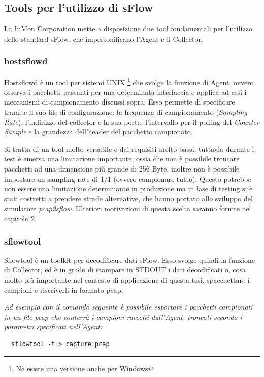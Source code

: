 \documentclass[12pt,a4paper,openright,twoside]{report}
\begin{document}
\subsection{Tools per l'utilizzo di sFlow}

La InMon Corporation mette a disposizione due tool fondamentali per l'utilizzo dello
standard sFlow, che impersonificano l'Agent e il Collector.

\subsubsection{hostsflowd}
Hostsflowd \`e un tool per sistemi UNIX \footnote{Ne esiste una versione anche per Windows}
che svolge la funzione di Agent, ovvero osserva
i pacchetti passanti per una determinata interfaccia e applica ad essi i meccanismi di
campionamento discussi sopra. Esso permette di specificare tramite il suo file di configurazione:
la frequenza di campionamento ({\it Sampling Rate}), l'indirizzo del collector e la
sua porta, l'intervallo per il polling del {\it Counter Sample} e la grandezza dell'header
del pacchetto campionato.

Si tratta di un tool molto versatile e dai requisiti molto bassi, tuttavia durante
i test \`e emersa una limitazione importante, ossia che non \`e possibile
troncare pacchetti ad una dimensione pi\`u grande di 256 Byte, inoltre non \`e possibile
impostare un sampling rate di 1/1 (ovvero campionare tutto). Questo potrebbe non essere
una limitazione determinante in produzione ma in fase di testing si \`e stati costretti
a prendere strade alternative, che hanno portato allo sviluppo del simulatore {\it pcap2sflow}.
Ulteriori motivazioni di questa scelta saranno fornite nel capitolo 2.

\subsubsection{sflowtool}

Sflowtool \`e un toolkit per decodificare
dati sFlow. Esso svolge quindi la funzione di Collector, ed \`e in grado di stampare
in STDOUT i dati decodificati o, cosa molto pi\`u importante nel contesto di applicazione
di questa tesi, spacchettare i campioni e
riscriverli in formato pcap.

{\it Ad esempio con il comando seguente \`e possibile esportare i pacchetti campionati
in un file pcap che conterr\`a i campioni raccolti dall'Agent, troncati secondo i
parametri specificati nell'Agent:}
\begin{verbatim}
  sflowtool -t > capture.pcap
\end{verbatim}
\end{document}
